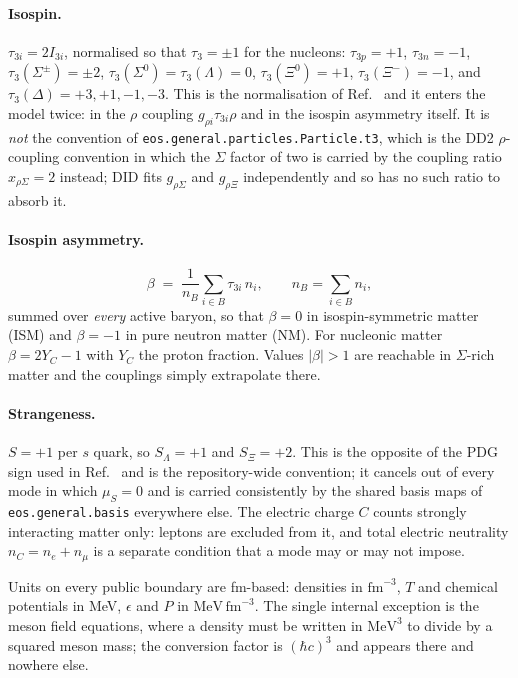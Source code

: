 \documentclass[aps,prc,onecolumn,superscriptaddress,nofootinbib,10pt]{revtex4-2}
\newcommand{\nB}{n_B}
\newcommand{\nC}{n_C}
\newcommand{\muS}{\mu_S}
\begin{document}
\paragraph{Isospin.} $\tau_{3i} = 2 I_{3i}$, normalised so that
$\tau_3 = \pm 1$ for the nucleons: $\tau_{3p} = +1$, $\tau_{3n} = -1$,
$\tau_3(\Sigma^{\pm}) = \pm 2$, $\tau_3(\Sigma^0) = \tau_3(\Lambda) = 0$,
$\tau_3(\Xi^0) = +1$, $\tau_3(\Xi^-) = -1$, and $\tau_3(\Delta) = +3, +1, -1,
-3$. This is the normalisation of Ref.~\cite{Frohaug2025} and it enters the
model twice: in the $\rho$ coupling $g_{\rho i}\tau_{3i}\rho$ and in the
isospin asymmetry itself. It is \emph{not} the convention of
\texttt{eos.general.particles.Particle.t3}, which is the DD2 $\rho$-coupling
convention in which the $\Sigma$ factor of two is carried by the coupling
ratio $x_{\rho\Sigma} = 2$ instead; DID fits $g_{\rho\Sigma}$ and
$g_{\rho\Xi}$ independently and so has no such ratio to absorb it.

\paragraph{Isospin asymmetry.}
\begin{equation}
  \beta \;=\; \frac{1}{\nB}\sum_{i \in B} \tau_{3i}\, n_i ,
  \qquad \nB = \sum_{i \in B} n_i ,
  \label{eq:beta}
\end{equation}
summed over \emph{every} active baryon, so that $\beta = 0$ in isospin-symmetric
matter (ISM) and $\beta = -1$ in pure neutron matter (NM). For nucleonic matter
$\beta = 2 Y_C - 1$ with $Y_C$ the proton fraction. Values $|\beta| > 1$ are
reachable in $\Sigma$-rich matter and the couplings simply extrapolate there.

\paragraph{Strangeness.} $S = +1$ per $s$ quark, so $S_\Lambda = +1$ and
$S_\Xi = +2$. This is the opposite of the PDG sign used in
Ref.~\cite{Frohaug2025} and is the repository-wide convention; it cancels out
of every mode in which $\muS = 0$ and is carried consistently by the shared
basis maps of \texttt{eos.general.basis} everywhere else. The electric charge
$C$ counts strongly interacting matter only: leptons are excluded from it, and
total electric neutrality $\nC = n_e + n_\mu$ is a separate condition that a
mode may or may not impose.

Units on every public boundary are fm-based: densities in $\mathrm{fm}^{-3}$,
$T$ and chemical potentials in MeV, $\epsilon$ and $P$ in
$\mathrm{MeV}\,\mathrm{fm}^{-3}$. The single internal exception is the meson
field equations, where a density must be written in $\mathrm{MeV}^3$ to divide
by a squared meson mass; the conversion factor is $(\hbar c)^3$ and appears
there and nowhere else.
\end{document}
